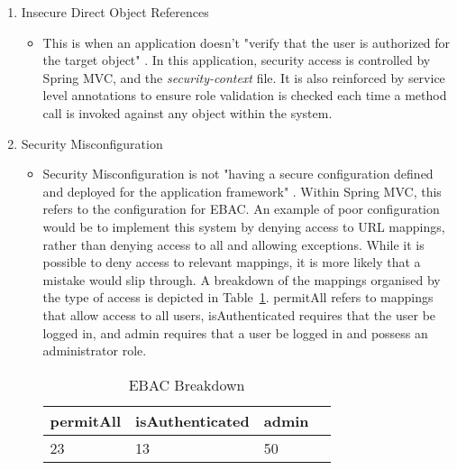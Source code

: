 \begin{enumerate}
\item Insecure Direct Object References
\begin{itemize}
\item This is when an application doesn't "verify that the user is authorized for the target object" \parencite{owasp2013}. In this application, security access is controlled by Spring MVC, and the \textit{security-context} file. It is also reinforced by service level annotations to ensure role validation is checked each time a method call is invoked against any object within the system.
\end{itemize}

\item Security Misconfiguration
\begin{itemize}
\item Security Misconfiguration is not "having a secure configuration defined and deployed for the application framework" \parencite{owasp2013}. Within Spring MVC, this refers to the configuration for EBAC. An example of poor configuration would be to implement this system by denying access to URL mappings, rather than denying access to all and allowing exceptions. While it is possible to deny access to relevant mappings, it is more likely that a mistake would slip through. A breakdown of the mappings organised by the type of access is depicted in Table~\ref{fig:accesstable}. permitAll refers to mappings that allow access to all users, isAuthenticated requires that the user be logged in, and admin requires that a user be logged in and possess an administrator role.

\begin{table}[H]
\caption{EBAC Breakdown}
\begin{center}
    \begin{tabular}{ | l | l | l | p{5cm} |}
    \hline
	\textbf{permitAll} & \textbf{isAuthenticated}& \textbf{admin}\\ \hline
	23 & 13 & 50\\ \hline
    \end{tabular}
\end{center}
\label{fig:accesstable}
\end{table} 
\end{itemize}


\end{enumerate}
